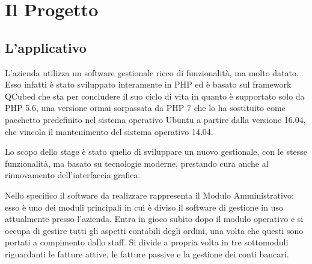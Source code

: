 
\chapter{Il Progetto}
\label{cap:progetto}


\section{L'applicativo}
	L’azienda utilizza un software gestionale ricco di funzionalità, ma molto datato.
	Esso infatti è stato sviluppato interamente in PHP ed è basato sul framework QCubed\cite{site:QCubed} che
	sta per concludere il suo ciclo di vita in quanto è supportato solo da PHP 5.6, una 
	versione ormai sorpassata da PHP 7 che lo ha sostituito come pacchetto predefinito nel sistema operativo Ubuntu
	a partire dalla versione 16.04, che vincola il mantenimento del sistema operativo 14.04.
	
	Lo scopo dello stage è stato quello di sviluppare un nuovo gestionale, con le stesse
	funzionalità, ma basato su tecnologie moderne, prestando cura anche al rinnovamento
	dell’interfaccia grafica. 
	
	Nello specifico il software da realizzare  rappresenta il Modulo Amministrativo: esso è uno dei moduli principali in cui è diviso il
	software di gestione in uso attualmente presso l’azienda. Entra in gioco subito dopo il modulo operativo
	e si occupa di gestire tutti gli aspetti contabili degli ordini, una volta che questi sono portati a compimento
	dallo staff. Si divide a propria volta in tre sottomoduli riguardanti le fatture attive, le fatture passive e la
	gestione dei conti bancari.
	

